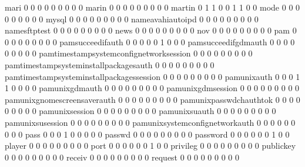 \documentclass[compress,8pt]{beamer}
\begin{document}
\begin{frame}
\begin{Schunk}
  mari                                       0   0   0   0   0   0   0   0   0
  marin                                      0   0   0   0   0   0   0   0   0
  martin                                     0   1   1   0   0   1   1   0   0
  mode                                       0   0   0   0   0   0   0   0   0
  mysql                                      0   0   0   0   0   0   0   0   0
  nameavahiautoipd                           0   0   0   0   0   0   0   0   0
  namesftptest                               0   0   0   0   0   0   0   0   0
  news                                       0   0   0   0   0   0   0   0   0
  nov                                        0   0   0   0   0   0   0   0   0
  pam                                        0   0   0   0   0   0   0   0   0
  pamsucceedifauth                           0   0   0   0   0   1   0   0   0
  pamsucceedifgdmauth                        0   0   0   0   0   0   0   0   0
  pamtimestampsystemconfignetworksession     0   0   0   0   0   0   0   0   0
  pamtimestampsysteminstallpackagesauth      0   0   0   0   0   0   0   0   0
  pamtimestampsysteminstallpackagessession   0   0   0   0   0   0   0   0   0
  pamunixauth                                0   0   0   1   1   0   0   0   0
  pamunixgdmauth                             0   0   0   0   0   0   0   0   0
  pamunixgdmsession                          0   0   0   0   0   0   0   0   0
  pamunixgnomescreensaverauth                0   0   0   0   0   0   0   0   0
  pamunixpasswdchauthtok                     0   0   0   0   0   0   0   0   0
  pamunixsession                             0   0   0   0   0   0   0   0   0
  pamunixsuauth                              0   0   0   0   0   0   0   0   0
  pamunixsusession                           0   0   0   0   0   0   0   0   0
  pamunixsystemconfignetworkauth             0   0   0   0   0   0   0   0   0
  pass                                       0   0   0   1   0   0   0   0   0
  passwd                                     0   0   0   0   0   0   0   0   0
  password                                   0   0   0   0   0   0   1   0   0
  player                                     0   0   0   0   0   0   0   0   0
  port                                       0   0   0   0   0   0   1   0   0
  privileg                                   0   0   0   0   0   0   0   0   0
  publickey                                  0   0   0   0   0   0   0   0   0
  receiv                                     0   0   0   0   0   0   0   0   0
  request                                    0   0   0   0   0   0   0   0   0

\end{Schunk}
\end{frame}
\end{document}
